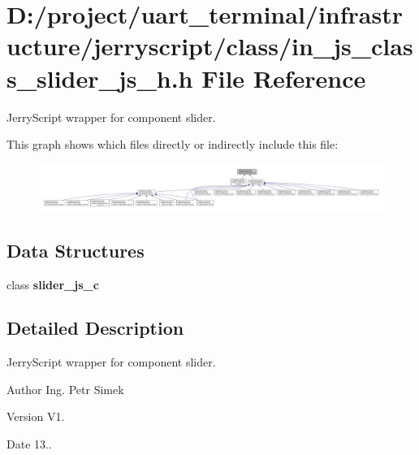 \section{D\+:/project/uart\+\_\+terminal/infrastructure/jerryscript/class/in\+\_\+js\+\_\+class\+\_\+slider\+\_\+js\+\_\+h.h File Reference}
\label{in__js__class__slider__js__h_8h}


Jerry\+Script wrapper for component slider.  


This graph shows which files directly or indirectly include this file\+:\nopagebreak
\begin{figure}[H]
\begin{center}
\leavevmode
\includegraphics[width=350pt]{in__js__class__slider__js__h_8h__dep__incl}
\end{center}
\end{figure}
\subsection*{Data Structures}
\begin{DoxyCompactItemize}
\item 
class \textbf{ slider\+\_\+js\+\_\+c}
\end{DoxyCompactItemize}


\subsection{Detailed Description}
Jerry\+Script wrapper for component slider. 

\begin{DoxyAuthor}{Author}
Ing. Petr Simek 
\end{DoxyAuthor}
\begin{DoxyVersion}{Version}
V1. 
\end{DoxyVersion}
\begin{DoxyDate}{Date}
13.. 
\end{DoxyDate}
